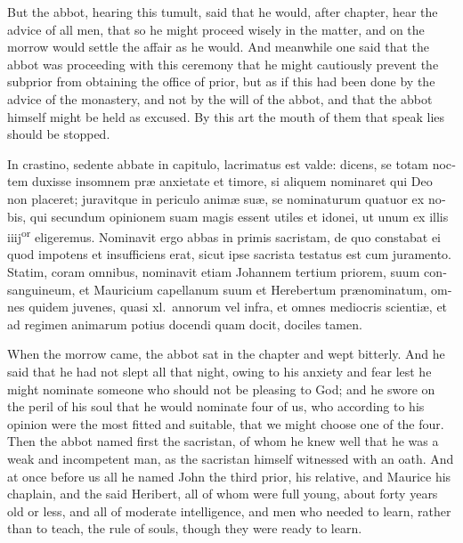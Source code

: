 \documentclass[10pt]{book}
\begin{document}
\begin{paracol}{2}
\switchcolumn

But the abbot, hearing this tumult, said that he would, after chapter, hear the advice of all men, that so he might proceed wisely in the matter, and on the morrow would settle the affair as he would. And meanwhile one said that the abbot was proceeding with this ceremony that he might cautiously prevent the subprior from obtaining the office of prior, but as if this had been done by the advice of the monastery, and not by the will of the abbot, and that the abbot himself might be held as excused. By this art the mouth of them that speak lies should be stopped.

\switchcolumn*

\begin{otherlanguage}{latin}
In crastino, sedente abbate in capitulo, lacrimatus est valde: dicens, se totam noctem duxisse insomnem pr\ae{} anxietate et timore, si aliquem nominaret qui Deo non placeret; juravitque in periculo anim\ae{} su\ae{}, se nominaturum quatuor ex nobis, qui secundum opinionem suam magis essent utiles et idonei, ut unum ex illis iiij\textsuperscript{or} eligeremus. Nominavit ergo abbas in primis sacristam, de quo constabat ei quod impotens et insufficiens erat, sicut ipse sacrista testatus est cum juramento. Statim, coram omnibus, nominavit etiam Johannem tertium priorem, suum consanguineum, et Mauricium capellanum suum et Herebertum pr\ae{}nominatum, omnes quidem juvenes, quasi xl.\ annorum vel infra, et omnes mediocris scienti\ae{}, et ad regimen animarum potius docendi quam docit, dociles tamen.
\end{otherlanguage}

\switchcolumn

When the morrow came, the abbot sat in the chapter and wept bitterly. And he said that he had not slept all that night, owing to his anxiety and fear lest he might nominate someone who should not be pleasing to God; and he swore on the peril of his soul that he would nominate four of us, who according to his opinion were the most fitted and suitable, that we might choose one of the four. Then the abbot named first the sacristan, of whom he knew well that he was a weak and incompetent man, as the sacristan himself witnessed with an oath. And at once before us all he named John the third prior, his relative, and Maurice his chaplain, and the said Heribert, all of whom were full young, about forty years old or less, and all of moderate intelligence, and men who needed to learn, rather than to teach, the rule of souls, though they were ready to learn.


\end{paracol}
\end{document}

